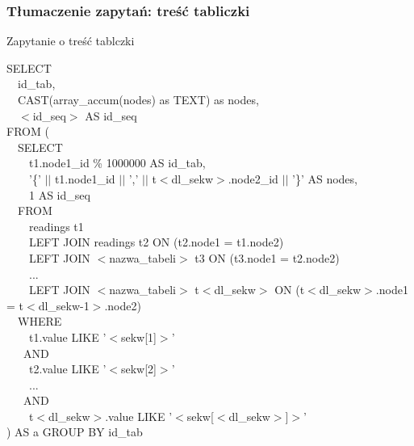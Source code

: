 \begin{frame}
 \frametitle{Tłumaczenie zapytań: treść tabliczki}

% 
% 

 \begin{block}{Zapytanie o treść tablczki}
\begin{scriptsize}
SELECT \\
~~id\_tab, \\
~~CAST(array\_accum(nodes) as TEXT) as nodes,\\
~~$<$id\_seq$>$ AS id\_seq\\
FROM (\\
~~SELECT\\
~~~~t1.node1\_id \% 1000000 AS id\_tab,\\
~~~~’\{’ $||$ t1.node1\_id $||$ ’,’ $||$ t$<$dl\_sekw$>$.node2\_id $||$ ’\}’ AS nodes,\\
~~~~1 AS id\_seq\\
~~FROM\\
~~~~readings t1\\
~~~~LEFT JOIN readings t2 ON (t2.node1 = t1.node2)\\
~~~~LEFT JOIN $<$nazwa\_tabeli$>$ t3 ON (t3.node1 = t2.node2)\\
~~~~...\\
~~~~LEFT JOIN $<$nazwa\_tabeli$>$ t$<$dl\_sekw$>$ ON (t$<$dl\_sekw$>$.node1 = t$<$dl\_sekw-1$>$.node2)\\
~~WHERE\\
~~~~t1.value LIKE ’$<$sekw[1]$>$’\\
~~~AND\\
~~~~t2.value LIKE ’$<$sekw[2]$>$’\\
~~~~...\\
~~~AND\\
~~~~t$<$dl\_sekw$>$.value LIKE ’$<$sekw[$<$dl\_sekw$>$]$>$’\\
) AS a
GROUP BY id\_tab

\end{scriptsize}
 \end{block}

\end{frame}

